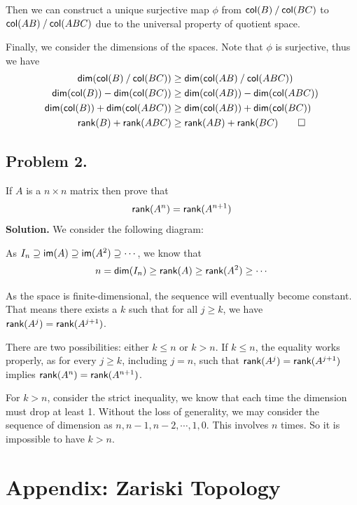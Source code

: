 Then we can construct a unique surjective map $\phi$ from $\quotient{\col(B)}{\col(BC)}$ to $\quotient{\col(AB)}{\col(ABC)}$ due to the universal property of quotient space.

Finally, we consider the dimensions of the spaces. Note that $\phi$ is surjective, thus we have
\begin{align*}
  \dim(\quotient{\col(B)}{\col(BC)}) & \geq \dim(\quotient{\col(AB)}{\col(ABC)}) \\
  \dim(\col(B)) - \dim(\col(BC))     & \geq \dim(\col(AB)) - \dim(\col(ABC))     \\
  \dim(\col(B)) + \dim(\col(ABC))    & \geq \dim(\col(AB)) + \dim(\col(BC))      \\
  \rank(B) + \rank(ABC)              & \geq \rank(AB) + \rank(BC) \qedhere
\end{align*}

\section*{Problem 2.}
If $A$ is a $n \times n$ matrix then prove that
\[
  \rank(A^n) = \rank(A^{n+1})
\]
\textbf{Solution.} We consider the following diagram:
\begin{center}
\end{center}
As $I_n \supseteq \im(A) \supseteq \im(A^2) \supseteq \cdots$, we know that
\[
  n = \dim(I_n) \geq \rank(A) \geq \rank(A^2) \geq \cdots
\]

As the space is finite-dimensional, the sequence will eventually become constant. That means there exists a $k$ such that for all $j \geq k$, we have $\rank(A^j) = \rank(A^{j + 1})$.

There are two possibilities: either $k \leq n$ or $k > n$. If $k \leq n$, the equality works properly, as for every $j \geq k$, including $j = n$, such that $\rank(A^j) = \rank(A^{j + 1})$ implies $\rank(A^n) = \rank(A^{n + 1})$.

For $k > n$, consider the strict inequality, we know that each time the dimension must drop at least 1. Without the loss of generality, we may consider the sequence of dimension as $n, n - 1, n - 2, \cdots, 1, 0$. This involves $n$ times. So it is impossible to have $k > n$.

\chapter*{Appendix: Zariski Topology}\label{appendix:zariski_topology}


